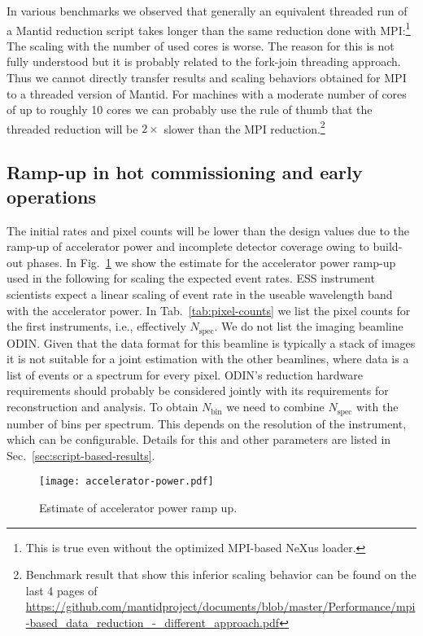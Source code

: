 \documentclass[a4paper,english,numbers=noenddot,bibliography=totoc,chapterprefix=on,DIV=12]{scrartcl}
\newcommand{\Nbin}{N_{\text{bin}}}
\newcommand{\Nspec}{N_{\text{spec}}}
\newcommand{\odin}{ODIN\xspace}
\newcommand{\mantid}{Mantid\xspace}
\begin{document}
In various benchmarks we observed that generally an equivalent threaded run of a \mantid reduction script takes longer than the same reduction done with MPI:\footnote{This is true even without the optimized MPI-based NeXus loader.}
The scaling with the number of used cores is worse.
The reason for this is not fully understood but it is probably related to the fork-join threading approach.
Thus we cannot directly transfer results and scaling behaviors obtained for MPI to a threaded version of \mantid.
For machines with a moderate number of cores of up to roughly 10 cores we can probably use the rule of thumb that the threaded reduction will be $2\times$ slower than the MPI reduction.\footnote{Benchmark result that show this inferior scaling behavior can be found on the last 4 pages of \url{https://github.com/mantidproject/documents/blob/master/Performance/mpi-based_data_reduction_-_different_approach.pdf}}


\subsection{Ramp-up in hot commissioning and early operations}

The initial rates and pixel counts will be lower than the design values due to the ramp-up of accelerator power and incomplete detector coverage owing to build-out phases.
In Fig.~\ref{fig:accelerator-power} we show the estimate for the accelerator power ramp-up used in the following for scaling the expected event rates.
ESS instrument scientists expect a linear scaling of event rate in the useable wavelength band with the accelerator power.
In Tab.~\ref{tab:pixel-counts} we list the pixel counts for the first instruments, i.e., effectively $\Nspec$.
We do not list the imaging beamline \odin.
Given that the data format for this beamline is typically a stack of images it is not suitable for a joint estimation with the other beamlines, where data is a list of events or a spectrum for every pixel.
\odin's reduction hardware requirements should probably be considered jointly with its requirements for reconstruction and analysis.
To obtain $\Nbin$ we need to combine $\Nspec$ with the number of bins per spectrum.
This depends on the resolution of the instrument, which can be configurable.
Details for this and other parameters are listed in Sec.~\ref{sec:script-based-results}.

\begin{figure}
  \centering
\texttt{[image: accelerator-power.pdf]}
\caption{\label{fig:accelerator-power}Estimate of accelerator power ramp up.}
\end{figure}
\end{document}
